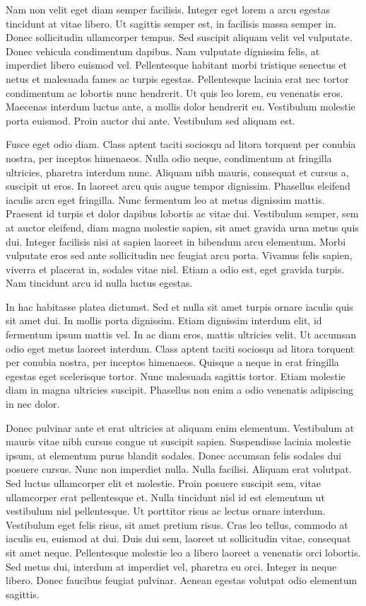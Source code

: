 \documentclass{EPUProjetDi}
\begin{document}
Nam non velit eget diam semper facilisis. Integer eget lorem a arcu egestas tincidunt at vitae libero. Ut sagittis semper est, in facilisis massa semper in. Donec sollicitudin ullamcorper tempus. Sed suscipit aliquam velit vel vulputate. Donec vehicula condimentum dapibus. Nam vulputate dignissim felis, at imperdiet libero euismod vel. Pellentesque habitant morbi tristique senectus et netus et malesuada fames ac turpis egestas. Pellentesque lacinia erat nec tortor condimentum ac lobortis nunc hendrerit. Ut quis leo lorem, eu venenatis eros. Maecenas interdum luctus ante, a mollis dolor hendrerit eu. Vestibulum molestie porta euismod. Proin auctor dui ante. Vestibulum sed aliquam est.

Fusce eget odio diam. Class aptent taciti sociosqu ad litora torquent per conubia nostra, per inceptos himenaeos. Nulla odio neque, condimentum at fringilla ultricies, pharetra interdum nunc. Aliquam nibh mauris, consequat et cursus a, suscipit ut eros. In laoreet arcu quis augue tempor dignissim. Phasellus eleifend iaculis arcu eget fringilla. Nunc fermentum leo at metus dignissim mattis. Praesent id turpis et dolor dapibus lobortis ac vitae dui. Vestibulum semper, sem at auctor eleifend, diam magna molestie sapien, sit amet gravida urna metus quis dui. Integer facilisis nisi at sapien laoreet in bibendum arcu elementum. Morbi vulputate eros sed ante sollicitudin nec feugiat arcu porta. Vivamus felis sapien, viverra et placerat in, sodales vitae nisl. Etiam a odio est, eget gravida turpis. Nam tincidunt arcu id nulla luctus egestas.

In hac habitasse platea dictumst. Sed et nulla sit amet turpis ornare iaculis quis sit amet dui. In mollis porta dignissim. Etiam dignissim interdum elit, id fermentum ipsum mattis vel. In ac diam eros, mattis ultricies velit. Ut accumsan odio eget metus laoreet interdum. Class aptent taciti sociosqu ad litora torquent per conubia nostra, per inceptos himenaeos. Quisque a neque in erat fringilla egestas eget scelerisque tortor. Nunc malesuada sagittis tortor. Etiam molestie diam in magna ultricies suscipit. Phasellus non enim a odio venenatis adipiscing in nec dolor.

Donec pulvinar ante et erat ultricies at aliquam enim elementum. Vestibulum at mauris vitae nibh cursus congue ut suscipit sapien. Suspendisse lacinia molestie ipsum, at elementum purus blandit sodales. Donec accumsan felis sodales dui posuere cursus. Nunc non imperdiet nulla. Nulla facilisi. Aliquam erat volutpat. Sed luctus ullamcorper elit et molestie. Proin posuere suscipit sem, vitae ullamcorper erat pellentesque et. Nulla tincidunt nisl id est elementum ut vestibulum nisl pellentesque. Ut porttitor risus ac lectus ornare interdum. Vestibulum eget felis risus, sit amet pretium risus. Cras leo tellus, commodo at iaculis eu, euismod at dui. Duis dui sem, laoreet ut sollicitudin vitae, consequat sit amet neque. Pellentesque molestie leo a libero laoreet a venenatis orci lobortis. Sed metus dui, interdum at imperdiet vel, pharetra eu orci. Integer in neque libero. Donec faucibus feugiat pulvinar. Aenean egestas volutpat odio elementum sagittis.
\end{document}
